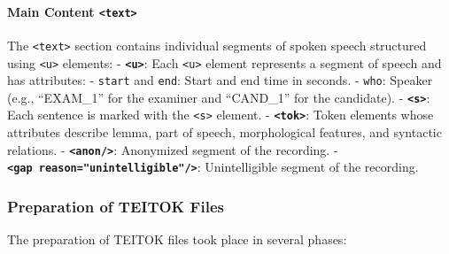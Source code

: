 \documentclass[
]{article}
\begin{document}
\hypertarget{main-content-text}{%
\paragraph{\texorpdfstring{Main Content
\texttt{\textless{}text\textgreater{}}}{Main Content \textless text\textgreater{}}}\label{main-content-text}}

The \texttt{\textless{}text\textgreater{}} section contains individual
segments of spoken speech structured using
\texttt{\textless{}u\textgreater{}} elements: -
\textbf{\texttt{\textless{}u\textgreater{}}}: Each
\texttt{\textless{}u\textgreater{}} element represents a segment of
speech and has attributes: - \texttt{start} and \texttt{end}: Start and
end time in seconds. - \texttt{who}: Speaker (e.g., ``EXAM\_1'' for the
examiner and ``CAND\_1'' for the candidate). -
\textbf{\texttt{\textless{}s\textgreater{}}}: Each sentence is marked
with the \texttt{\textless{}s\textgreater{}} element. -
\textbf{\texttt{\textless{}tok\textgreater{}}}: Token elements whose
attributes describe lemma, part of speech, morphological features, and
syntactic relations. - \textbf{\texttt{\textless{}anon/\textgreater{}}}:
Anonymized segment of the recording. -
\textbf{\texttt{\textless{}gap\ reason="unintelligible"/\textgreater{}}}:
Unintelligible segment of the recording.

\hypertarget{preparation-of-teitok-files}{%
\subsubsection{Preparation of TEITOK
Files}\label{preparation-of-teitok-files}}

The preparation of TEITOK files took place in several phases:
\end{document}
